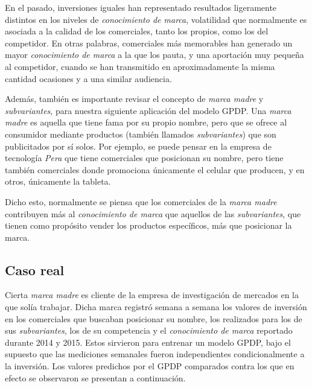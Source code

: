 En el pasado, inversiones iguales han representado resultados ligeramente distintos en los niveles de \textit{conocimiento de marca}, volatilidad que normalmente es asociada a la calidad de los comerciales, tanto los propios, como los del competidor. En otras palabras, comerciales m\'as memorables han generado un mayor \textit{conocimiento de marca} a la que los pauta, y una aportaci\'on muy pequeña al competidor, cuando se han transmitido en aproximadamente la misma cantidad ocasiones y a una similar audiencia.

Adem\'as, tambi\'en es importante revisar el concepto de \textit{marca madre} y \textit{subvariantes}, para nuestra siguiente aplicaci\'on del modelo GPDP. Una \textit{marca madre} es aquella que tiene fama por su propio nombre, pero que se ofrece al consumidor mediante productos (tambi\'en llamados \textit{subvariantes}) que son publicitados por s\'i solos. Por ejemplo, se puede pensar en la empresa de tecnolog\'ia \textit{Pera} que tiene comerciales que posicionan su nombre, pero tiene tambi\'en comerciales donde promociona \'unicamente el celular que producen, y en otros, \'unicamente la tableta.

Dicho esto, normalmente se piensa que los comerciales de la \textit{marca madre} contribuyen m\'as al \textit{conocimiento de marca} que aquellos de las \textit{subvariantes}, que tienen como prop\'osito vender los productos espec\'ificos, m\'as que posicionar la marca.

\subsection{Caso real}

Cierta \textit{marca madre} es cliente de la empresa de investigaci\'on de mercados en la que sol\'ia trabajar. Dicha marca registr\'o semana a semana los valores de inversi\'on en los comerciales que buscaban posicionar su nombre, los realizados para los de sus \textit{subvariantes}, los de su competencia y el \textit{conocimiento de marca} reportado durante 2014 y 2015. Estos sirvieron para entrenar un modelo GPDP, bajo el supuesto que las mediciones semanales fueron independientes condicionalmente a la inversi\'on. Los valores predichos por el GPDP comparados contra los que en efecto se observaron se presentan a continuaci\'on.


